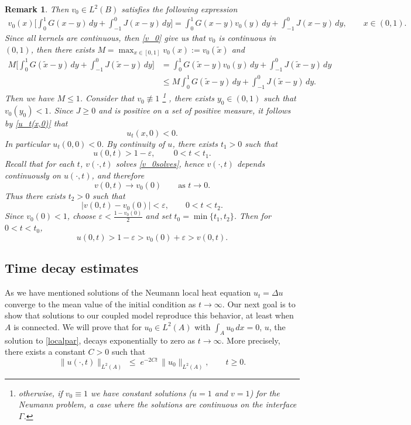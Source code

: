 \documentclass[reqno]{amsart}
\numberwithin{equation}{section}
\newtheorem{remark}[theorem]{Remark}
\begin{document}
\begin{remark}
{Then $v_0\in L^2(B)$ satisfies the following expression
\begin{align}\label{v_0}
v_0(x)\bigg[\int_{0}^{1}G(x-y)\,dy+\int_{-1}^{0}J(x-y)\,dy\bigg]=\int_0^1 G(x-y)v_0(y)\,dy
+\int_{-1}^0 J(x-y)\,dy, \qquad x\in (0,1).\end{align}
Since all kernels are continuous, then \eqref{v_0} give us that $v_0$ is continuous in $(0,1)$, then there exists $M=\max_{x\in [0,1]}v_0(x):=v_0(\tilde x)$ and
\begin{align*}
    M\bigg[\int_{0}^{1}G(\tilde x-y)\,dy+\int_{-1}^{0}J(\tilde x-y)\,dy\bigg]&=\int_0^1 G(\tilde x-y)v_0(y)\,dy
+\int_{-1}^0 J(\tilde x-y)\,dy\\
&\le M\int_0^1 G(\tilde x-y)\,dy
+\int_{-1}^0 J(\tilde x-y)\,dy.
\end{align*}
Then we have $M\leq 1$. Consider that $v_0\not\equiv1$ \footnote{otherwise, if $v_0\equiv 1$ we have constant solutions ($u=1$ and $v=1$) for the Neumann problem, a case where the solutions are continuous on the interface $\Gamma$.} , there exists $y_0\in(0,1)$ such that $v_0(y_0)<1$. Since $J\ge0$ and is positive on a set of positive measure, it follows by \eqref{u_t(x,0)} that
\[
u_t(x,0)<0 .
\]
In particular $u_t(0,0)<0$. By continuity of $u$, there exists $t_1>0$ such that
\[u(0,t) > 1-\varepsilon, \qquad \ 0<t<t_1.\] Recall that for each $t$, $v(\cdot,t)$ solves \eqref{v_0solves}, hence $v(\cdot,t)$ depends continuously on $u(\cdot,t)$, and therefore
\[
v(0,t)\to v_0(0) \qquad \text{as } t\to0 .
\]
Thus there exists $t_2>0$ such that
$$|v(0,t)-v_0(0)|<\varepsilon, \qquad 0<t<t_2.$$
Since $v_0(0)<1$, choose $\varepsilon<\frac{1-v_0(0)}{2}$ and set $t_0=\min\{t_1,t_2\}$. Then for $0<t<t_0$,
\[u(0,t) > 1-\varepsilon > v_0(0)+\varepsilon > v(0,t).\]}
\end{remark}


\subsection{Time decay estimates} \label{time.decay.1}



As we have mentioned solutions of the Neumann local heat equation 
$u_t = \Delta u $
converge to the mean value of the initial condition as $t\to \infty$. Our
next goal is to show that solutions to our coupled model reproduce this behavior, at least when $A$ is connected. 
We will prove that for $u_0\in L^2(A)$ with $\int_A u_0\,dx = 0$, $u$, the 
solution to \eqref{localpar}, decays exponentially to zero as $t\to\infty$.  
More precisely, there exists a constant $C>0$ such that
\begin{equation}\label{abneumann.66}
\|u(\cdot,t)\|_{L^2(A)}
\;\le\;
e^{-2C t}\,\|u_0\|_{L^2(A)},
\qquad t\ge 0.
\end{equation}
\end{document}
